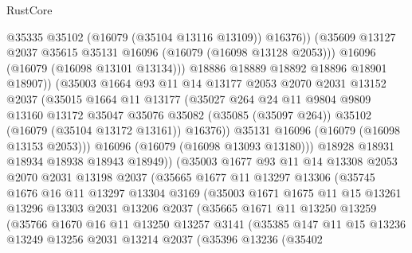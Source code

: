 \begin{lexlean}{RustCore}
\begin{coremodule}
                      @35335
                      @35102
                      (@16079 (@35104 @13116 @13109))
                      @16376))
                  (@35609 @13127 @2037 @35615 @35131 @16096 (@16079 (@16098 @13128 @2053)))
                  @16096
                  (@16079 (@16098 @13101 @13134)))
                @18886
                @18889
                @18892
                @18896
                @18901
                @18907))
            (@35003
              @1664
              @93
              @11
              @14
              @13177
              @2053
              @2070
              @2031
              @13152
              @2037
              (@35015
                @1664
                @11
                @13177
                (@35027
                  @264
                  @24
                  @11
                  @9804
                  @9809
                  @13160
                  @13172
                  @35047
                  @35076
                  @35082
                  (@35085 (@35097 @264))
                  @35102
                  (@16079 (@35104 @13172 @13161))
                  @16376))
              @35131
              @16096
              (@16079 (@16098 @13153 @2053)))
            @16096
            (@16079 (@16098 @13093 @13180)))
          @18928
          @18931
          @18934
          @18938
          @18943
          @18949))
      (@35003
        @1677
        @93
        @11
        @14
        @13308
        @2053
        @2070
        @2031
        @13198
        @2037
        (@35665
          @1677
          @11
          @13297
          @13306
          (@35745
            @1676
            @16
            @11
            @13297
            @13304
            @3169
            (@35003
              @1671
              @1675
              @11
              @15
              @13261
              @13296
              @13303
              @2031
              @13206
              @2037
              (@35665
                @1671
                @11
                @13250
                @13259
                (@35766
                  @1670
                  @16
                  @11
                  @13250
                  @13257
                  @3141
                  (@35385
                    @147
                    @11
                    @15
                    @13236
                    @13249
                    @13256
                    @2031
                    @13214
                    @2037
                    (@35396
                      @13236
                      (@35402

\end{coremodule}
\end{lexlean}
